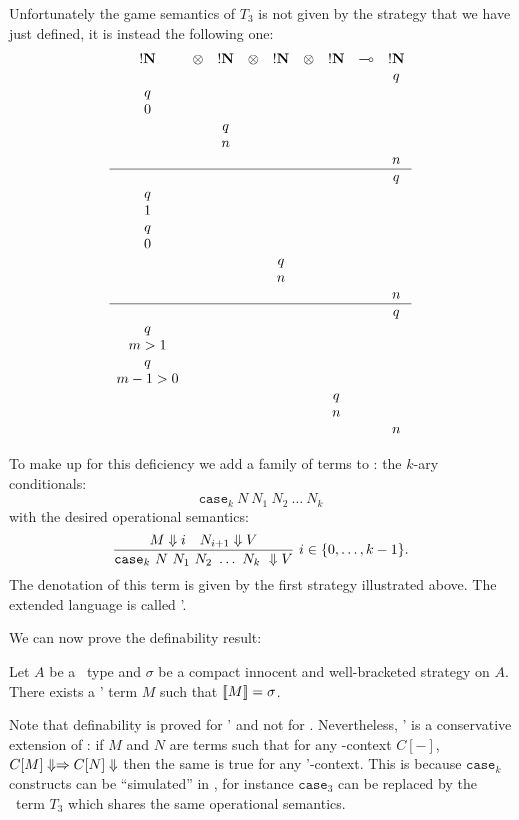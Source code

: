 Unfortunately the game semantics of $T_3$ is not given by the
strategy that we have just defined, it is instead the following one:
$$
\begin{array}{ccccccccc}
!\bf N & \otimes & !\bf N & \otimes & !\bf N & \otimes & !\bf N & \multimap & !\bf N \\
&&&&&&&&q \\
q \\
0 \\
&& q \\
&& n \\
&&&&&&&&n \\
\hline
&&&&&&&&q \\
q \\
1 \\
q \\
0 \\
&&&& q \\
&&&& n \\
&&&&&&&&n \\
\hline
&&&&&&&&q \\
q \\
m>1 \\
q \\
m-1>0 \\
&&&&&& q \\
&&&&&& n \\
&&&&&&&&n \\
\end{array}
$$

To make up for this deficiency we add a family of terms to \pcf: the $k$-ary conditionals:
$$ \texttt{case}_k\ N\ N_1\ N_2\ \ldots\ N_k$$
with the desired operational semantics:
$$ \frac{\displaystyle M \Downarrow i \quad N_{i+1} \Downarrow V}{\texttt{case}_k\ N\ N_1\ N_2\ \ldots\ N_k\ \Downarrow V}\ i \in \{0, \ldots,k-1\}.$$
The denotation of this term is given by the first strategy illustrated above.
The extended language is called \pcf'.

We can now prove the definability result:
\begin{prop}[Definability]
\label{prop:definability} Let $A$ be a \pcf\ type and $\sigma$ be a compact innocent and well-bracketed
strategy on $A$. There exists a \pcf' term $M$ such that ${[\![ M ]\!]} = \sigma$.
\end{prop}

Note that definability is proved for \pcf' and not for \pcf.
Nevertheless, \pcf' is a conservative extension of \pcf: if $M$ and
$N$ are terms such that for any \pcf-context $C[-]$, $C[M] \Downarrow
\Rightarrow C[N] \Downarrow$ then the same is true for any \pcf'-context. This
is because $\texttt{case}_k$ constructs can be ``simulated'' in
\pcf, for instance $\texttt{case}_3$ can be replaced by the \pcf\
term $T_3$ which shares the same operational semantics.

